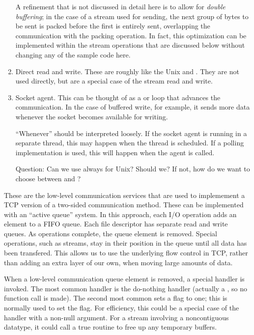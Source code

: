 \begin{enumerate}
    A refinement that is not discussed in detail here is to allow for
    \emph{double 
    buffering}; in the case of a stream used for sending, the next
    group of bytes to be sent is packed before the first is entirely
    sent, overlapping the communication with the packing operation.  In fact,
    this optimization can be implemented within the stream operations that are
    discussed below without changing any of the sample code here.

\item Direct read and write.  These are roughly like the Unix
   and .  They are not used directly, but are a special
  case of the stream read and write.

\item Socket agent.  This can be thought of as a 
    or  loop that advances the communication.  In the case
    of buffered write, for example, it sends more data whenever the
    socket becomes available for writing.

    ``Whenever'' should be interpreted loosely.  If the socket
    agent is running in a separate thread, this may happen when the
    thread is scheduled.  If a polling implementation is used, this
    will happen when the agent is called.

    Question: Can we use  always for Unix?  Should we?  If not, how
    do we want to choose between  and ?

\end{enumerate}

These are the low-level communication services that are used to
implemement a TCP version of a two-sided communication method.
These can be implemented with an ``active queue'' system.  In this
approach, each I/O operation adds an element to a FIFO queue.  Each
file descriptor has separate read and write queues.  As operations
complete, the queue element is removed.  Special operations, such as
streams, stay in their position in the queue until all data has been
transfered.  This allows us to use the underlying flow control in TCP,
rather than adding an extra layer of our own, when moving large
amounts of data.

When a low-level communication queue element is removed, a special handler is
invoked.  The 
most common handler is the do-nothing handler (actually a , so no
function call is made).  The second most common
sets a flag to one; this is normally used to set the
 flag.  For efficiency, this could be a
special case of the  handler with a non-null argument.
For a stream involving a noncontiguous datatype, it could call a true
routine to free up any temporary buffers.

